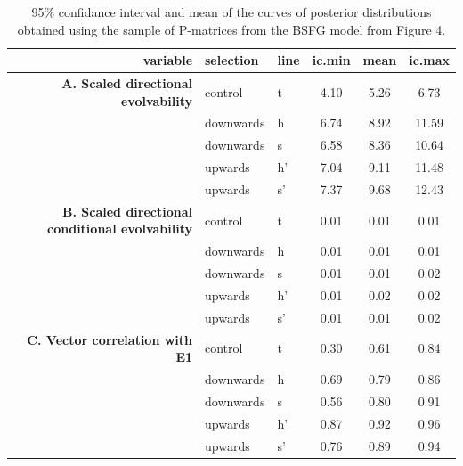 \begin{refsection}
\begin{table}
\centering
\caption[Directional matrix statistics confidence intervals]{95\% confidance interval and mean of the curves of posterior distributions obtained using the sample of P-matrices from the BSFG model from Figure 4.}
\begin{tabular}{rllccc}
  \hline
variable & selection & line & ic.min & mean & ic.max \\
  \hline
\textbf{A. Scaled directional evolvability} & control & t & 4.10 & 5.26 & 6.73 \\
  & downwards & h & 6.74 & 8.92 & 11.59 \\
   & downwards & s & 6.58 & 8.36 & 10.64 \\
   & upwards & h' & 7.04 & 9.11 & 11.48 \\
   & upwards & s' & 7.37 & 9.68 & 12.43 \\
\textbf{B. Scaled directional conditional evolvability} & control & t & 0.01 & 0.01 & 0.01 \\
   & downwards & h & 0.01 & 0.01 & 0.01 \\
   & downwards & s & 0.01 & 0.01 & 0.02 \\
   & upwards & h' & 0.01 & 0.02 & 0.02 \\
   & upwards & s' & 0.01 & 0.01 & 0.02 \\
\textbf{C. Vector correlation with E1} & control & t & 0.30 & 0.61 & 0.84 \\
   & downwards & h & 0.69 & 0.79 & 0.86 \\
   & downwards & s & 0.56 & 0.80 & 0.91 \\
   & upwards & h' & 0.87 & 0.92 & 0.96 \\
   & upwards & s' & 0.76 & 0.89 & 0.94 \\
   \hline
\end{tabular}
\end{table}


\end{refsection}
